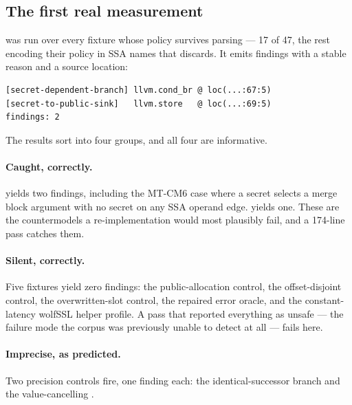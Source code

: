 \subsection{The first real measurement}

 was run over every fixture whose policy survives parsing --- 17
of 47, the rest encoding their policy in SSA names that 
discards. It emits findings with a stable reason and a source location:

\begin{center}
\begin{minipage}{0.9\linewidth}\small
\begin{verbatim}
[secret-dependent-branch] llvm.cond_br @ loc(...:67:5)
[secret-to-public-sink]   llvm.store   @ loc(...:69:5)
findings: 2
\end{verbatim}
\end{minipage}
\end{center}

The results sort into four groups, and all four are informative.

\paragraph{Caught, correctly.}  yields two
findings, including the MT-CM6 case where a secret selects a merge block argument
with no secret on any SSA operand edge.  yields
one. These are the countermodels a re-implementation would most plausibly fail,
and a 174-line pass catches them.

\paragraph{Silent, correctly.} Five fixtures yield zero findings: the
public-allocation control, the offset-disjoint control, the overwritten-slot
control, the repaired error oracle, and the constant-latency wolfSSL helper
profile. A pass that reported everything as unsafe --- the failure mode the
corpus was previously unable to detect at all --- fails here.

\paragraph{Imprecise, as predicted.} Two precision controls fire, one finding
each: the identical-successor branch and the value-cancelling .

